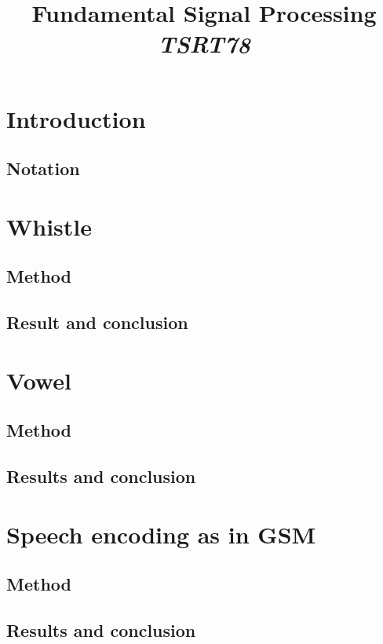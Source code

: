 \documentclass[10pt]{article}
\title{Fundamental Signal Processing\\
\emph{TSRT78}}
\begin{document}
\maketitle

\newpage
\tableofcontents
\newpage

\section{Introduction}

\subsection{Notation}


\section{Whistle}
\subsection{Method}
\subsection{Result and conclusion}

\section{Vowel}
\subsection{Method}
\subsection{Results and conclusion}

\section{Speech encoding as in GSM}
\subsection{Method}
\subsection{Results and conclusion}
\end{document}
